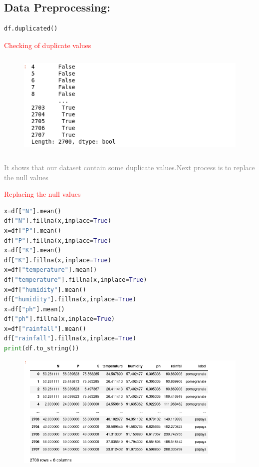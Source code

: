 \subsection{Data Preprocessing:}
\begin{lstlisting}[language=Python]
    df.duplicated()
\end{lstlisting}
\newline
\textcolor{red}{\hspace{0.5cm}Checking of duplicate values}
\begin{figure}[ht]
    \centering
    \includegraphics[width=5in,height=2in]{duplicates.png}
    \label{fig:data}
\end{figure}

\textcolor{gray}{\hspace{0.5cm}It shows that our dataset contain some duplicate values.Next process is to replace the null values}

\textcolor{red}{Replacing the null values}
\begin{lstlisting}[language=Python]
x=df["N"].mean()
df["N"].fillna(x,inplace=True)
x=df["P"].mean()
df["P"].fillna(x,inplace=True)
x=df["K"].mean()
df["K"].fillna(x,inplace=True)
x=df["temperature"].mean()
df["temperature"].fillna(x,inplace=True)
x=df["humidity"].mean()
df["humidity"].fillna(x,inplace=True)
x=df["ph"].mean()
df["ph"].fillna(x,inplace=True)
x=df["rainfall"].mean()
df["rainfall"].fillna(x,inplace=True)
print(df.to_string())
\end{lstlisting}

\begin{figure}[ht]
    \centering
    \includegraphics[width=7in]{replace.png}
\end{figure}

